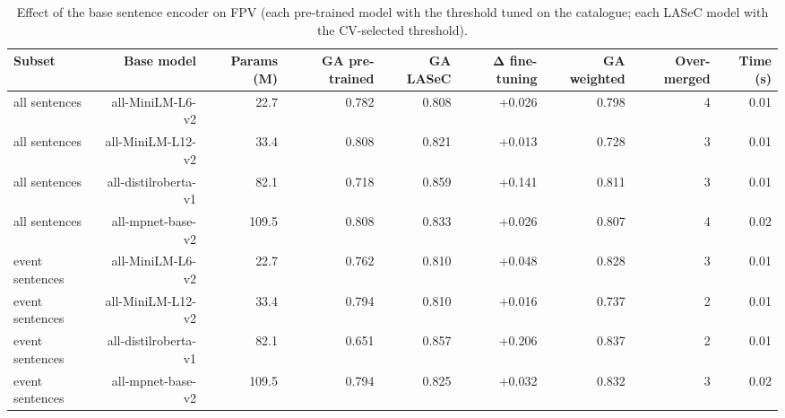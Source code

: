 \begin{table}[t]
\centering
\caption{Effect of the base sentence encoder on FPV (each pre-trained model with the threshold tuned on the catalogue; each LASeC model with the CV-selected threshold).}
\label{tab:base_models}
\small
\begin{tabular}{lrrrrrrrr}
\toprule
Subset & Base model & Params (M) & GA pre-trained & GA LASeC & Δ fine-tuning & GA weighted & Over-merged & Time (s) \\
\midrule
all sentences & all-MiniLM-L6-v2 & 22.7 & 0.782 & 0.808 & +0.026 & 0.798 & 4 & 0.01 \\
all sentences & all-MiniLM-L12-v2 & 33.4 & 0.808 & 0.821 & +0.013 & 0.728 & 3 & 0.01 \\
all sentences & all-distilroberta-v1 & 82.1 & 0.718 & 0.859 & +0.141 & 0.811 & 3 & 0.01 \\
all sentences & all-mpnet-base-v2 & 109.5 & 0.808 & 0.833 & +0.026 & 0.807 & 4 & 0.02 \\
event sentences & all-MiniLM-L6-v2 & 22.7 & 0.762 & 0.810 & +0.048 & 0.828 & 3 & 0.01 \\
event sentences & all-MiniLM-L12-v2 & 33.4 & 0.794 & 0.810 & +0.016 & 0.737 & 2 & 0.01 \\
event sentences & all-distilroberta-v1 & 82.1 & 0.651 & 0.857 & +0.206 & 0.837 & 2 & 0.01 \\
event sentences & all-mpnet-base-v2 & 109.5 & 0.794 & 0.825 & +0.032 & 0.832 & 3 & 0.02 \\
\bottomrule
\end{tabular}
\end{table}
